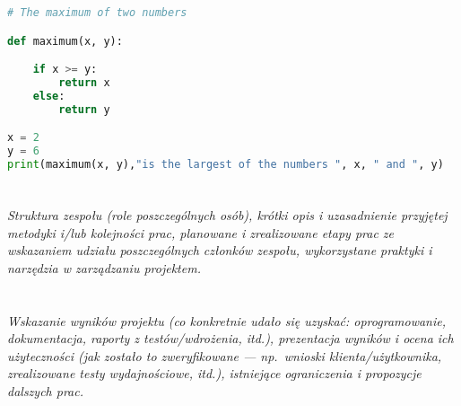 \documentclass[polish]{aghengthesis}
\newcommand{\listofalgorithmes}{\tocfile{\listalgorithmcfname}{loa}}
\renewcommand\lstlistlistingname{\LangListOfListings}
\renewcommand{\lstlistoflistings}{\begingroup
\tocfile{\lstlistlistingname}{lol}
\endgroup}
\begin{document}
\begin{lstlisting}[language=Python,float=!htbp,caption={[Przykładowy fragment kodu]Przykładowy fragment kodu (źródło:
  \cite{author2021title})},label=lst:maximum]
# The maximum of two numbers

def maximum(x, y):

    if x >= y:
        return x
    else:
        return y

x = 2
y = 6
print(maximum(x, y),"is the largest of the numbers ", x, " and ", y)

\end{lstlisting}

\chapter{\ChapterTitleWorkOrganization}
\label{sec:organizacja-pracy}

\emph{Struktura zespołu (role poszczególnych osób), krótki opis i uzasadnienie przyjętej metodyki i/lub kolejności prac, planowane i zrealizowane etapy prac ze wskazaniem udziału poszczególnych członków zespołu, wykorzystane praktyki i narzędzia w zarządzaniu projektem.}

\chapter{\ChapterTitleResults}
\label{sec:wyniki-projektu}

\emph{Wskazanie wyników projektu (co konkretnie udało się uzyskać: oprogramowanie, dokumentacja, raporty z testów/wdrożenia, itd.), prezentacja wyników i ocena ich użyteczności (jak zostało to zweryfikowane --- np.\ wnioski klienta/użytkownika, zrealizowane testy wydajnościowe, itd.), istniejące ograniczenia i propozycje dalszych prac.}

\printbibliography

\listoffigures
\listoftables
\listofalgorithmes
\lstlistoflistings
\end{document}
